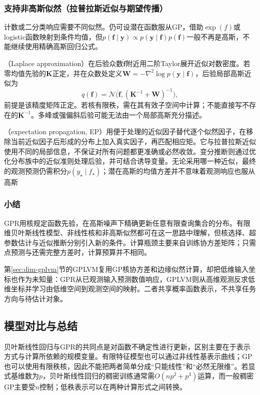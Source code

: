 \subsubsection{支持非高斯似然（拉普拉斯近似与期望传播）}
\label{sec:regression-gp-nongaussian}

计数或二分类响应需要不同似然。仍可设潜在函数服从GP，借助$\exp(f)$或logistic函数映射到条件均值，但$p(\bm{f}\mid\bm{y})\propto p(\bm{y}\mid\bm{f})p(\bm{f})$一般不再是高斯，不能继续使用精确高斯回归公式。

（Laplace approximation）在后验众数$\widehat{\bm{f}}$附近用二阶Taylor展开近似对数密度。若零均值先验的$\bm{K}$正定，并在众数处定义$\bm{W}=-\nabla^2\log p(\bm{y}\mid\bm{f})$，后验局部高斯近似为
\[
  q(\bm{f})=\mathcal{N}\bigl(
       \widehat{\bm{f}},(\bm{K}^{-1}+\bm{W})^{-1}\bigr),
\]
前提是该精度矩阵正定。若核有限秩，需在其有效子空间中计算；不能直接写不存在的$\bm{K}^{-1}$。多峰或强偏斜后验可能无法由一个局部高斯充分描述。

（expectation propagation, EP）用便于处理的近似因子替代逐个似然因子，在移除当前近似因子后形成的分布上加入真实因子，再匹配相应矩。它与拉普拉斯近似使用不同的局部信息，不保证对所有问题都更准确或必然收敛。变分推断则通过优化分布族中的近似准则处理后验，并可结合诱导变量。无论采用哪一种近似，最终的观测预测仍需积分$p(y_{\star}\mid f_{\star})$；潜在高斯的均值方差并不意味着观测响应也服从高斯

\subsubsection{小结}

GPR用核规定函数先验，在高斯噪声下精确更新任意有限查询集合的分布。有限维贝叶斯线性模型、非线性核和非高斯似然都可在这一思路中理解，但核选择、超参数估计与近似推断分别引入新的条件。计算瓶颈主要来自训练协方差矩阵；只需点预测与还需完整方差时，计算预算并不相同。

第\ref{sec:dim-gplvm}节的GPLVM复用GP核协方差和边缘似然计算，却把低维输入坐标也作为未知量：GPR从已观测输入预测数值响应，GPLVM则从高维观测反求低维坐标并学习由低维空间到观测空间的映射。二者共享概率函数表示，不共享任务方向与待估计对象。

\subsection{模型对比与总结}

贝叶斯线性回归与GPR的共同点是对函数不确定性进行更新，区别主要在于表示方式与计算所依赖的规模变量。有限特征模型也可以通过非线性基表示曲线；GP也可以使用有限秩核，因此不能把两者简单分成“只能线性”和“必然无限维”。若显式基维数为$p$，贝叶斯线性回归的稠密训练通常需$O(np^2+p^3)$运算，而一般稠密GP主要受$n$控制；低秩表示可以在两种计算形式之间转换。


